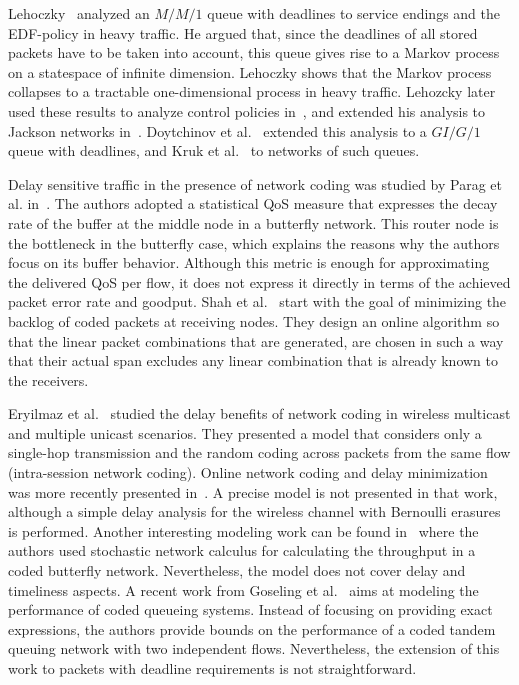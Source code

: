 \documentclass[preprint,12pt]{elsarticle}
\theoremstyle{definition}
\theoremstyle{plain}
\theoremstyle{remark}
\begin{document}
Lehoczky~\cite{Lehoczky_mm1} analyzed an $M/M/1$ queue with deadlines to service endings and the EDF-policy in heavy traffic. He argued that, since the deadlines of all stored packets have to be taken into account, this queue gives rise to a Markov process on a statespace of infinite dimension. Lehoczky shows that the Markov process collapses to a tractable one-dimensional process in heavy traffic. Lehozcky later used these results to analyze control policies in~\cite{Lehoczky_control}, and extended his analysis to Jackson networks in~\cite{Lehoczky_jackson}. Doytchinov et al.~\cite{doytchinov_edf_heavy_traffic} extended this analysis to a $GI/G/1$ queue with deadlines, and Kruk et al.~\cite{kruk_edf_heavy_traffic_networks} to networks of such queues.

Delay sensitive traffic in the presence of network coding was studied by Parag et al. in~\cite{parag08}. The authors adopted a statistical QoS measure that expresses the decay rate of the buffer at the middle node in a butterfly network. This router node is the bottleneck in the butterfly case, which explains the reasons why the authors focus on its buffer behavior. Although this metric is enough for approximating the delivered QoS per flow, it does not express it directly in terms of the achieved packet error rate and goodput. Shah et al.~\cite{shah07} start with the goal of minimizing the backlog of coded packets at receiving nodes. They design an online algorithm so that the linear packet combinations that are generated, are chosen in such a way that their actual span excludes any linear combination that is already known to the receivers.

Eryilmaz et al.~\cite{eryilmaz06} studied the delay benefits of network coding in wireless multicast and multiple unicast scenarios. They presented a model that considers only a single-hop transmission and the random coding across packets from the same flow (intra-session network coding). Online network coding and delay minimization was more recently presented in~\cite{barros09a}. A precise model is not presented in that work, although a simple delay analysis for the wireless channel with Bernoulli erasures is performed. Another interesting modeling work can be found in~\cite{wu09} where the authors used stochastic network calculus for calculating the throughput in a coded butterfly network. Nevertheless, the model does not cover delay and timeliness aspects. A recent work from Goseling et al.~\cite{goseling09} aims at modeling the performance of coded queueing systems. Instead of focusing on providing exact expressions, the authors provide bounds on the performance of a coded tandem queuing network with two independent flows. Nevertheless, the extension of this work to packets with deadline requirements is not straightforward.
\end{document}

